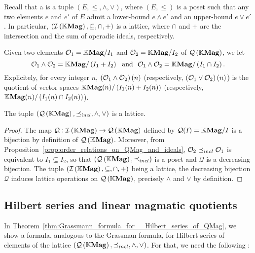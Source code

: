 Recall that a  is a tuple $\left(E,\leq,\wedge,\vee\right)$,
where $\left(E,\leq\right)$ is a poset such that any two elements $e$
and $e'$ of $E$ admit a lower-bound $e\wedge e'$ and an upper-bound
$e\vee e'$. In particular, $\left(\mathcal{I}\left(\mathbb{K}\mathbf{Mag}\right),\subseteq,\cap,+\right)$ is a
lattice, where $\cap$ and $+$ are the intersection and the sum of
operadic ideals, respectively.

Given two elements $\mathcal{O}_1=\mathbb{K}\mathbf{Mag}/I_1$ and $\mathcal{O}_2=\mathbb{K}\mathbf{Mag}/I_2$ of $\mathcal{Q}\left(\mathbb{K}\mathbf{Mag}\right)$,
we let
\begin{equation} \label{equ:definition_of_lattice_operations_of_QMag}
  \mathcal{O}_1\wedge \mathcal{O}_2=\mathbb{K}\mathbf{Mag}/\left(I_1+I_2\right)\ \ \text{and}\ \
  \mathcal{O}_1\wedge \mathcal{O}_2=\mathbb{K}\mathbf{Mag}/\left(I_1\cap I_2\right).
\end{equation}
Explicitely, for every integer $n$, $\left(\mathcal{O}_1\wedge\mathcal{O}_2\right)(n)$
(respectively, $\left(\mathcal{O}_1\vee\mathcal{O}_2\right)(n)$) is the quotient of
vector spaces $\mathbb{K}\mathbf{Mag}(n)/\left(I_1(n)+I_2(n)\right)$ (respectively,
$\mathbb{K}\mathbf{Mag}(n)/\left(I_1(n)\cap I_2(n)\right)$).

\begin{Theorem} \label{thm:lattice_structure_of_QMag}
  The tuple $\left(\mathcal{Q}\left(\mathbb{K}\mathbf{Mag}\right),\preceq_{incl},\wedge,\vee\right)$ is a lattice.
\end{Theorem}

\begin{proof}
  The map $\mathcal{Q}:\mathcal{I}\left(\mathbb{K}\mathbf{Mag}\right)\to\mathcal{Q}\left(\mathbb{K}\mathbf{Mag}\right)$ defined by $\mathcal{Q}(I)=\mathbb{K}\mathbf{Mag}/I$
  is a bijection by definition of $\mathcal{Q}\left(\mathbb{K}\mathbf{Mag}\right)$. Moreover, from
  Proposition~\ref{prop:order_relations_on_QMag_and_ideals},
  $\mathcal{O}_2\preceq_{incl}\mathcal{O}_1$ is equivalent to $I_1\subseteq I_2$, so that
  $\left(\mathcal{Q}\left(\mathbb{K}\mathbf{Mag}\right),\preceq_{incl}\right)$ is a poset and $\mathcal{Q}$ is a
  decreasing bijection. The tuple $\left(\mathcal{I}\left(\mathbb{K}\mathbf{Mag}\right),\subseteq,\cap,+\right)$
  being a lattice, the decreasing bijection $\mathcal{Q}$ induces
  lattice operations on $\mathcal{Q}\left(\mathbb{K}\mathbf{Mag}\right)$, precisely $\wedge$ and $\vee$ by
  definition.
\end{proof}


\subsection{Hilbert series and linear magmatic quotients}

In Theorem~\ref{thm:Grassmann_formula_for__Hilbert_series_of_QMag}, we
show a formula, analogous to the Grassman formula, for Hilbert series of
elements of the lattice $\left(\mathcal{Q}\left(\mathbb{K}\mathbf{Mag}\right),\preceq_{incl},\wedge,\vee\right)$. For
that, we need the following :

